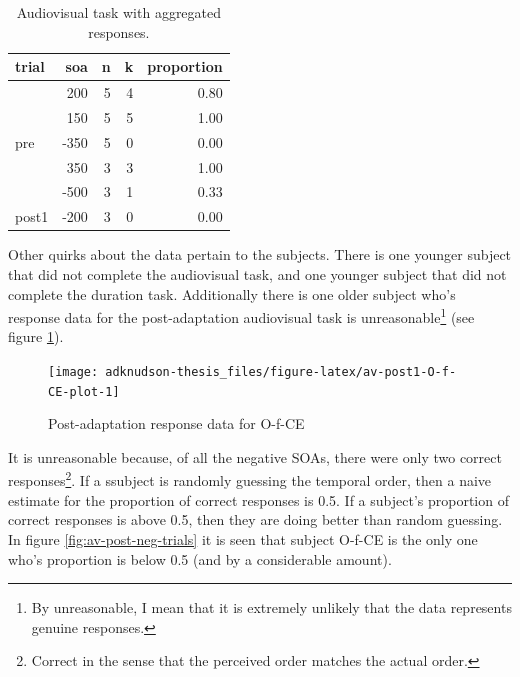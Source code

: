\documentclass[
]{report}
\begin{document}
\begin{table}[!h]

\caption{\label{tab:av-bin-sample}Audiovisual task with aggregated responses.}
\centering
\begin{tabular}[t]{lrrrr}
\toprule
trial & soa & n & k & proportion\\
\midrule
 & 200 & 5 & 4 & 0.80\\
\cmidrule{2-5}
 & 150 & 5 & 5 & 1.00\\
\cmidrule{2-5}
\multirow[t]{-3}{*}{\raggedright\arraybackslash pre} & -350 & 5 & 0 & 0.00\\
\cmidrule{1-5}
 & 350 & 3 & 3 & 1.00\\
\cmidrule{2-5}
 & -500 & 3 & 1 & 0.33\\
\cmidrule{2-5}
\multirow[t]{-3}{*}{\raggedright\arraybackslash post1} & -200 & 3 & 0 & 0.00\\
\bottomrule
\end{tabular}
\end{table}

Other quirks about the data pertain to the subjects. There is one younger subject that did not complete the audiovisual task, and one younger subject that did not complete the duration task. Additionally there is one older subject who's response data for the post-adaptation audiovisual task is unreasonable\footnote{By unreasonable, I mean that it is extremely unlikely that the data represents genuine responses.} (see figure \ref{fig:av-post1-O-f-CE-plot}).

\begin{figure}

{\centering \texttt{[image: adknudson-thesis\_files/figure-latex/av-post1-O-f-CE-plot-1]} 

}

\caption{Post-adaptation response data for O-f-CE}\label{fig:av-post1-O-f-CE-plot}
\end{figure}

It is unreasonable because, of all the negative SOAs, there were only two correct responses\footnote{Correct in the sense that the perceived order matches the actual order.}. If a ssubject is randomly guessing the temporal order, then a naive estimate for the proportion of correct responses is 0.5. If a subject's proportion of correct responses is above 0.5, then they are doing better than random guessing. In figure \ref{fig:av-post-neg-trials} it is seen that subject O-f-CE is the only one who's proportion is below 0.5 (and by a considerable amount).
\end{document}
